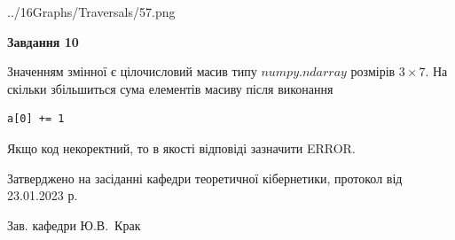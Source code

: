 \documentclass[12pt, ukrainian]{article}
\begin{document}
{\begin {large}
\begin{center}
	{../16Graphs/Traversals/57.png}
\end{center}\par
\newpage

{\begin {center}\textbf{Завдання 10}\end {center}}\par
Значенням змінної  є цілочисловий масив типу $numpy.ndarray$ розмірів $3{\times}7$. На скільки збільшиться сума елементів масиву  після виконання
\begin{verbatim}
a[0] += 1
\end{verbatim}


Якщо код некоректний, то в якості відповіді зазначити ERROR.\par
\newpage


\end {large}
}
{\smallskip \begin {small} Затверджено на засіданні кафедри теоретичної кібернетики, протокол  від   23.01.2023 р.\par\smallskip\smallskip
{\parbox {6.5 cm}{Зав. кафедри \dotfill Ю.В.~Крак}} \end{small}}
\end{document}
